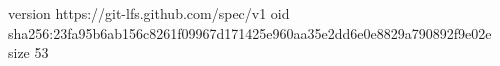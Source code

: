 version https://git-lfs.github.com/spec/v1
oid sha256:23fa95b6ab156c8261f09967d171425e960aa35e2dd6e0e8829a790892f9e02e
size 53
